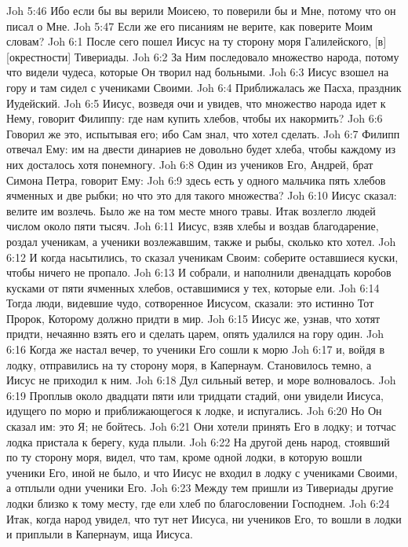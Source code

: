 Joh 5:46  Ибо если бы вы верили Моисею, то поверили бы и Мне, потому что он писал о Мне.
Joh 5:47  Если же его писаниям не верите, как поверите Моим словам?
Joh 6:1  После сего пошел Иисус на ту сторону моря Галилейского, [в] [окрестности] Тивериады.
Joh 6:2  За Ним последовало множество народа, потому что видели чудеса, которые Он творил над больными.
Joh 6:3  Иисус взошел на гору и там сидел с учениками Своими.
Joh 6:4  Приближалась же Пасха, праздник Иудейский.
Joh 6:5  Иисус, возведя очи и увидев, что множество народа идет к Нему, говорит Филиппу: где нам купить хлебов, чтобы их накормить?
Joh 6:6  Говорил же это, испытывая его; ибо Сам знал, что хотел сделать.
Joh 6:7  Филипп отвечал Ему: им на двести динариев не довольно будет хлеба, чтобы каждому из них досталось хотя понемногу.
Joh 6:8  Один из учеников Его, Андрей, брат Симона Петра, говорит Ему:
Joh 6:9  здесь есть у одного мальчика пять хлебов ячменных и две рыбки; но что это для такого множества?
Joh 6:10  Иисус сказал: велите им возлечь. Было же на том месте много травы. Итак возлегло людей числом около пяти тысяч.
Joh 6:11  Иисус, взяв хлебы и воздав благодарение, роздал ученикам, а ученики возлежавшим, также и рыбы, сколько кто хотел.
Joh 6:12  И когда насытились, то сказал ученикам Своим: соберите оставшиеся куски, чтобы ничего не пропало.
Joh 6:13  И собрали, и наполнили двенадцать коробов кусками от пяти ячменных хлебов, оставшимися у тех, которые ели.
Joh 6:14  Тогда люди, видевшие чудо, сотворенное Иисусом, сказали: это истинно Тот Пророк, Которому должно придти в мир.
Joh 6:15  Иисус же, узнав, что хотят придти, нечаянно взять его и сделать царем, опять удалился на гору один.
Joh 6:16  Когда же настал вечер, то ученики Его сошли к морю
Joh 6:17  и, войдя в лодку, отправились на ту сторону моря, в Капернаум. Становилось темно, а Иисус не приходил к ним.
Joh 6:18  Дул сильный ветер, и море волновалось.
Joh 6:19  Проплыв около двадцати пяти или тридцати стадий, они увидели Иисуса, идущего по морю и приближающегося к лодке, и испугались.
Joh 6:20  Но Он сказал им: это Я; не бойтесь.
Joh 6:21  Они хотели принять Его в лодку; и тотчас лодка пристала к берегу, куда плыли.
Joh 6:22  На другой день народ, стоявший по ту сторону моря, видел, что там, кроме одной лодки, в которую вошли ученики Его, иной не было, и что Иисус не входил в лодку с учениками Своими, а отплыли одни ученики Его.
Joh 6:23  Между тем пришли из Тивериады другие лодки близко к тому месту, где ели хлеб по благословении Господнем.
Joh 6:24  Итак, когда народ увидел, что тут нет Иисуса, ни учеников Его, то вошли в лодки и приплыли в Капернаум, ища Иисуса.
